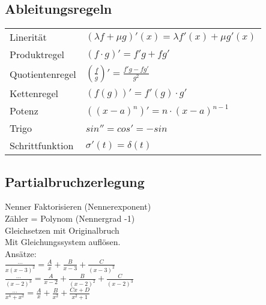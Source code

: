 \begin{minipage}{0.5\textwidth}
  \subsection{Ableitungsregeln}
  \begin{tabular}{ll}
    Linerität       & $(\lambda f + \mu g)'(x) = \lambda f'(x) + \mu g'(x)$ \\
    \rowcolor{TabularBackgroundColor}
    Produktregel    & $(f\cdot g)' = f'g + fg'$                             \\
    Quotientenregel & $(\frac{f}{g})' = \frac{f'g - fg'}{g^2}$              \\
    \rowcolor{TabularBackgroundColor}
    Kettenregel     & $ (f(g))' = f'(g) \cdot g' $                          \\
    Potenz          & $((x-a)^n)'= n\cdot(x-a)^{n-1}$                       \\
    \rowcolor{TabularBackgroundColor}
    Trigo           & $sin'' = cos' = -sin$                                 \\
    Schrittfunktion & $\sigma'(t) = \delta(t)$
  \end{tabular}
\end{minipage}%
\begin{minipage}{0.5\textwidth}
  \subsection{Partialbruchzerlegung}
  Nenner Faktorisieren (Nennerexponent)
  \\Zähler = Polynom (Nennergrad -1)
  \\Gleichsetzen mit Originalbruch
  \\Mit Gleichungssystem auflösen.
  \\Ansätze:
  \\ $\frac{\dots}{x(x-3)^2} = \frac{A}{x} + \frac{B}{x-3} + \frac{C}{(x-3)^2}$
  \\ $\frac{\dots}{(x-2)^3} = \frac{A}{x-2} + \frac{B}{(x-2)^2} + \frac{C}{(x-2)^3}$
  \\ $\frac{\dots}{x^4 + x^2} = \frac{A}{x} + \frac{B}{x^2} + \frac{Cx + D}{x^2 + 1}$
\end{minipage}
